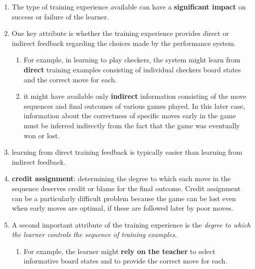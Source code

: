\begin{enumerate}[itemsep=0.2cm]
    \item The type of training experience available can have a \textbf{significant impact} on success or failure of the learner.
    \hfill \cite{ml/book/Machine-Learning/Tom-M-Mitchell}

    \item One key attribute is whether the training experience provides direct or indirect feedback regarding the choices made by the performance system.
    \hfill \cite{ml/book/Machine-Learning/Tom-M-Mitchell}
    \begin{enumerate}
        \item For example, in learning to play checkers, the system might learn from \textbf{direct} training examples consisting of individual checkers board states and the correct move for each.
        \hfill \cite{ml/book/Machine-Learning/Tom-M-Mitchell}

        \item it might have available only \textbf{indirect} information consisting of the move sequences and final outcomes of various games played. In this later case, information about the correctness of specific moves early in the game must be inferred indirectly from the fact that the game was eventually won or lost.
        \hfill \cite{ml/book/Machine-Learning/Tom-M-Mitchell}
    \end{enumerate}

    \item learning from direct training feedback is typically easier than learning from indirect feedback.
    \hfill \cite{ml/book/Machine-Learning/Tom-M-Mitchell}

    \item \textbf{credit assignment}: determining the degree to which each move in the sequence deserves credit or blame for the final outcome. Credit assignment can be a particularly difficult problem because the game can be lost even when early moves are optimal, if these are followed later by poor moves.
    \hfill \cite{ml/book/Machine-Learning/Tom-M-Mitchell}

    \item A second important attribute of the training experience is the \textit{degree to which the learner controls the sequence of training examples}. 
    \begin{enumerate}
        \item For example, the learner might \textbf{rely on the teacher} to select informative board states and to provide the correct move for each. 
        \hfill \cite{ml/book/Machine-Learning/Tom-M-Mitchell}


\end{enumerate}
\end{enumerate}
